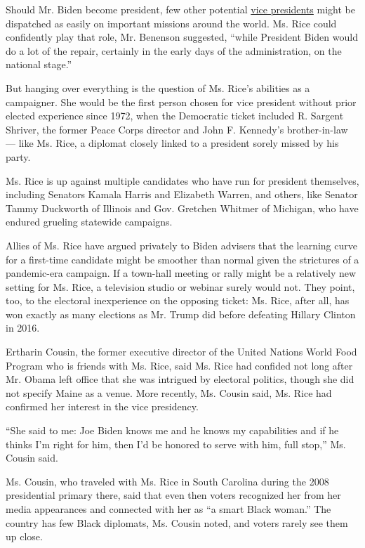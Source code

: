 Should Mr. Biden become president, few other potential
\href{https://www.nytimes.com/2020/07/29/nyregion/val-demings-biden-vp.html}{vice
presidents} might be dispatched as easily on important missions around
the world. Ms. Rice could confidently play that role, Mr. Benenson
suggested, ``while President Biden would do a lot of the repair,
certainly in the early days of the administration, on the national
stage.''

But hanging over everything is the question of Ms. Rice's abilities as a
campaigner. She would be the first person chosen for vice president
without prior elected experience since 1972, when the Democratic ticket
included R. Sargent Shriver, the former Peace Corps director and John F.
Kennedy's brother-in-law --- like Ms. Rice, a diplomat closely linked to
a president sorely missed by his party.

Ms. Rice is up against multiple candidates who have run for president
themselves, including Senators Kamala Harris and Elizabeth Warren, and
others, like Senator Tammy Duckworth of Illinois and Gov. Gretchen
Whitmer of Michigan, who have endured grueling statewide campaigns.

Allies of Ms. Rice have argued privately to Biden advisers that the
learning curve for a first-time candidate might be smoother than normal
given the strictures of a pandemic-era campaign. If a town-hall meeting
or rally might be a relatively new setting for Ms. Rice, a television
studio or webinar surely would not. They point, too, to the electoral
inexperience on the opposing ticket: Ms. Rice, after all, has won
exactly as many elections as Mr. Trump did before defeating Hillary
Clinton in 2016.

Ertharin Cousin, the former executive director of the United Nations
World Food Program who is friends with Ms. Rice, said Ms. Rice had
confided not long after Mr. Obama left office that she was intrigued by
electoral politics, though she did not specify Maine as a venue. More
recently, Ms. Cousin said, Ms. Rice had confirmed her interest in the
vice presidency.

``She said to me: Joe Biden knows me and he knows my capabilities and if
he thinks I'm right for him, then I'd be honored to serve with him, full
stop,'' Ms. Cousin said.

Ms. Cousin, who traveled with Ms. Rice in South Carolina during the 2008
presidential primary there, said that even then voters recognized her
from her media appearances and connected with her as ``a smart Black
woman.'' The country has few Black diplomats, Ms. Cousin noted, and
voters rarely see them up close.

